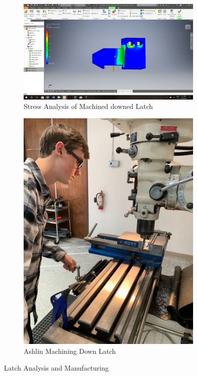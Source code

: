 \documentclass{article}
\begin{document}
\begin{figure}[h!]
\centering
\begin{subfigure}{.45\textwidth}
  \centering
  \includegraphics[width=\textwidth]{32_04-08/images/StressLatch.png}
  \caption{Stress Analysis of Machined downed Latch}
  \label{fig:StressLatch}
 \end{subfigure}
\begin{subfigure}{.45\textwidth}
  \centering
  \includegraphics[width=\textwidth]{32_04-08/images/NewLatch.jpg}
  \caption{Ashlin Machining Down Latch}
  \label{fig:MachinLatch}
  \end{subfigure}
  \caption{Latch Analysis and Manufacturing}
  \end{figure}
\end{document}
